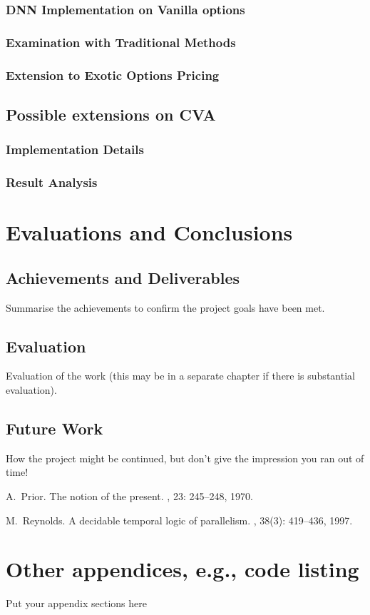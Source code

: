 \documentclass{report}
\begin{document}
\subsection{DNN Implementation on Vanilla options}
\subsection{Examination with Traditional Methods}
\subsection{Extension to Exotic Options Pricing}

\section{Possible extensions on CVA}
\subsection{Implementation Details}
\subsection{Result Analysis}


\chapter{Evaluations and Conclusions}
\section{Achievements and Deliverables}
Summarise the achievements to confirm the project goals have been met.
\section{Evaluation}
Evaluation of the work (this may be in a separate chapter if there is substantial evaluation).
\section{Future Work}
How the project might be continued, but don't give the impression you ran out of time!

\appendix


\begin{thebibliography}{HHM99}


A.~Prior.
\newblock The notion of the present.
, 23:  245--248, 1970.


M.~Reynolds.
\newblock A decidable temporal logic of parallelism.
, 38(3):  419--436,
  1997.
\end{thebibliography}
\chapter{Other appendices, e.g., code listing}
Put your appendix sections here
\end{document}
